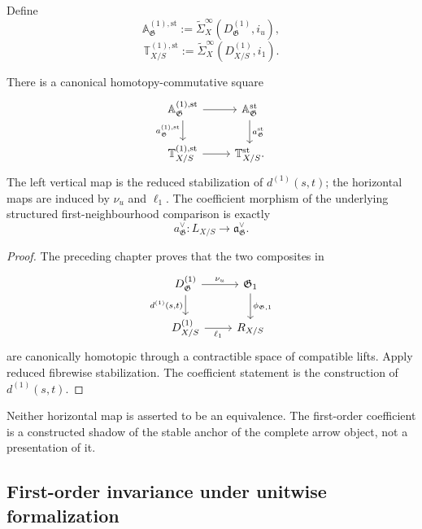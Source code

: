 \begin{definition}
\label{def:bnla-first-order-stable-coefficients}
Define
\[
    \mathbb A^{(1),\mathrm{st}}_{\mathfrak G}
    :=
    \widetilde\Sigma^\infty_X
    \left(D^{(1)}_{\mathfrak G},i_u\right),
\]
\[
    \mathbb T^{(1),\mathrm{st}}_{X/S}
    :=
    \widetilde\Sigma^\infty_X
    \left(D^{(1)}_{X/S},i_1\right).
\]
\end{definition}

\begin{theorem}
\label{thm:bnla-first-order-stable-comparison}
There is a canonical homotopy-commutative square
\[
\begin{tikzcd}
\mathbb A^{(1),\mathrm{st}}_{\mathfrak G}
  \arrow[r]
  \arrow[d,"a^{(1),\mathrm{st}}_{\mathfrak G}"'] &
\mathbb A^{\mathrm{st}}_{\mathfrak G}
  \arrow[d,"a^{\mathrm{st}}_{\mathfrak G}"]\\
\mathbb T^{(1),\mathrm{st}}_{X/S}
  \arrow[r] &
\mathbb T^{\mathrm{st}}_{X/S}.
\end{tikzcd}
\]
The left vertical map is the reduced stabilization of
$d^{(1)}(s,t)$; the horizontal maps are induced by $\nu_u$ and $\ell_1$.
The coefficient morphism of the underlying structured first-neighbourhood
comparison is exactly
\[
    a^\vee_{\mathfrak G}:
    L_{X/S}\longrightarrow\mathfrak a^\vee_{\mathfrak G}.
\]
\end{theorem}

\begin{proof}
The preceding chapter proves that the two composites in
\[
\begin{tikzcd}
D^{(1)}_{\mathfrak G}
  \arrow[r,"\nu_u"]
  \arrow[d,"{d^{(1)}(s,t)}"'] &
\mathfrak G_1
  \arrow[d,"\phi_{\mathfrak G,1}"]\\
D^{(1)}_{X/S}
  \arrow[r,"\ell_1"'] &
R_{X/S}
\end{tikzcd}
\]
are canonically homotopic through a contractible space of compatible lifts.
Apply reduced fibrewise stabilization.  The coefficient statement is the
construction of $d^{(1)}(s,t)$.
\end{proof}

\begin{remark}
Neither horizontal map is asserted to be an equivalence.  The first-order
coefficient is a constructed shadow of the stable anchor of the complete arrow
object, not a presentation of it.
\end{remark}

\subsection{First-order invariance under unitwise formalization}

